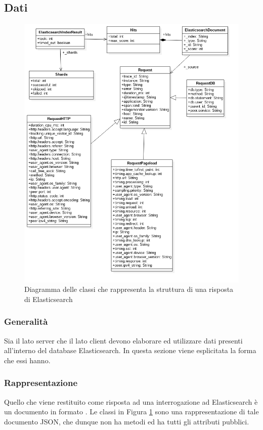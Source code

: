 \subsection{Dati}
\label{sec:dati}

\begin{figure}[H]
    \centering
    \includegraphics[width=1\textwidth]{Images/classiDati.png}
    \caption{Diagramma delle classi  che rappresenta la struttura di una risposta di Elasticsearch}
    \label{img:dati}
\end{figure}

\subsubsection{Generalità}
Sia il lato server che il lato client devono elaborare ed utilizzare dati presenti all'interno del database Elasticsearch. In questa sezione viene esplicitata la forma che essi hanno.

\subsubsection{Rappresentazione}
Quello che viene restituito come risposta ad una interrogazione ad Elasticsearch è un documento in formato . Le classi in Figura \ref{img:dati} sono una rappresentazione di tale documento JSON, che dunque non ha metodi ed ha tutti gli attributi pubblici.

